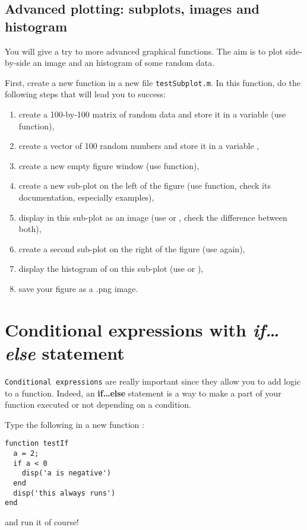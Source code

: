 \documentclass{article}
\begin{document}
\subsection{Advanced plotting: subplots, images and histogram}

You will give a try to more advanced graphical functions.
The aim is to plot side-by-side an image and an histogram of some random data.

First, create a new function  in a new file \verb|testSubplot.m|.
In this function, do the following steps that will lead you to success:
\begin{enumerate}
  \item create a 100-by-100 matrix of random data and store it in a variable  (use  function),
  \item create a vector of 100 random numbers and store it in a variable ,
  \item create a new empty figure window (use  function),
  \item create a new sub-plot on the left of the figure (use  function, check its documentation, especially examples),
  \item display in this sub-plot  as an image (use  or , check the difference between both),
  \item create a second sub-plot on the right of the figure (use  again),
  \item display the histogram of  on this sub-plot (use  or ),
  \item save your figure as a .png image.
\end{enumerate}


\section{Conditional expressions with \emph{if\dots else} statement}

\verb|Conditional expressions| are really important since they allow you to add logic to a function.
Indeed, an \textbf{if\dots else} statement is a way to make a part of your function executed or not depending on a condition.

Type the following in a new function :
\begin{lstlisting}
function testIf
  a = 2;
  if a < 0
    disp('a is negative')
  end
  disp('this always runs')
end
\end{lstlisting}
and run it of course!
\end{document}
